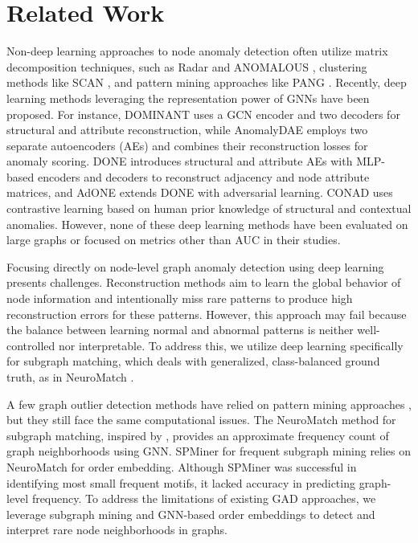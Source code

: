 \documentclass[pdflatex,sn-mathphys-num]{sn-jnl}%
\theoremstyle{thmstyleone}%
\theoremstyle{thmstyletwo}%
\theoremstyle{thmstylethree}%
\begin{document}
\section{Related Work}
\label{sec:relatedworks}

Non-deep learning approaches to node anomaly detection often utilize matrix decomposition techniques, such as Radar \cite{li2017radar} and ANOMALOUS \cite{peng2018anomalous}, clustering methods like SCAN \cite{xu2007scan}, and pattern mining approaches like PANG \cite{potin2023pattern}. Recently, deep learning methods leveraging the representation power of GNNs have been proposed. For instance, DOMINANT \cite{ding2019deep} uses a GCN encoder and two decoders for structural and attribute reconstruction, while AnomalyDAE \cite{fan2020anomalydae} employs two separate autoencoders (AEs) and combines their reconstruction losses for anomaly scoring. DONE \cite{bandyopadhyay2020outlier} introduces structural and attribute AEs with MLP-based encoders and decoders to reconstruct adjacency and node attribute matrices, and AdONE \cite{bandyopadhyay2020outlier} extends DONE with adversarial learning. CONAD \cite{xu2022contrastive} uses contrastive learning based on human prior knowledge of structural and contextual anomalies. However, none of these deep learning methods have been evaluated on large graphs or focused on metrics other than AUC in their studies.

Focusing directly on node-level graph anomaly detection using deep learning presents challenges. Reconstruction methods \cite{ding2019deep,fan2020anomalydae,xu2022contrastive,yuan2024higherorder} aim to learn the global behavior of node information and intentionally miss rare patterns to produce high reconstruction errors for these patterns. However, this approach may fail \cite{Ruff_2021} because the balance between learning normal and abnormal patterns is neither well-controlled nor interpretable. To address this, we utilize deep learning specifically for subgraph matching, which deals with generalized, class-balanced ground truth, as in NeuroMatch \cite{rex2020neural}.

A few graph outlier detection methods have relied on pattern mining approaches \cite{potin2023pattern,yuan2024higherorder}, but they still face the same computational issues. The NeuroMatch method for subgraph matching, inspired by \cite{vendrov2016orderembeddings}, provides an approximate frequency count of graph neighborhoods using GNN. SPMiner for frequent subgraph mining \cite{ying2024representation} relies on NeuroMatch for order embedding. Although SPMiner was successful in identifying most small frequent motifs, it lacked accuracy in predicting graph-level frequency. To address the limitations of existing GAD approaches, we leverage subgraph mining and GNN-based order embeddings to detect and interpret rare node neighborhoods in graphs.
\end{document}

